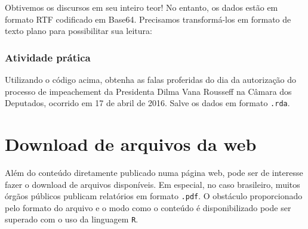 \documentclass[]{book}
\newenvironment{Shaded}{\begin{snugshade}}{\end{snugshade}}
\newcommand{\ControlFlowTok}[1]{\textcolor[rgb]{0.13,0.29,0.53}{\textbf{#1}}}
\newcommand{\DataTypeTok}[1]{\textcolor[rgb]{0.13,0.29,0.53}{#1}}
\newcommand{\DecValTok}[1]{\textcolor[rgb]{0.00,0.00,0.81}{#1}}
\newcommand{\KeywordTok}[1]{\textcolor[rgb]{0.13,0.29,0.53}{\textbf{#1}}}
\newcommand{\NormalTok}[1]{#1}
\newcommand{\OperatorTok}[1]{\textcolor[rgb]{0.81,0.36,0.00}{\textbf{#1}}}
\newcommand{\StringTok}[1]{\textcolor[rgb]{0.31,0.60,0.02}{#1}}
\begin{document}
Obtivemos os discursos em seu inteiro teor! No entanto, os dados estão em formato
RTF codificado em Base64. Precisamos transformá-los em formato de texto plano para
possibilitar sua leitura:

\begin{Shaded}
\end{Shaded}

\hypertarget{atividade-pruxe1tica-1}{%
\subsubsection{Atividade prática}\label{atividade-pruxe1tica-1}}

Utilizando o código acima, obtenha as falas proferidas do dia da autorização do
processo de impeachement da Presidenta Dilma Vana Rousseff na Câmara dos Deputados,
ocorrido em 17 de abril de 2016. Salve os dados em formato \texttt{.rda}.

\hypertarget{download-de-arquivos-da-web}{%
\section{Download de arquivos da web}\label{download-de-arquivos-da-web}}

Além do conteúdo diretamente publicado numa página web, pode ser de interesse
fazer o download de arquivos disponíveis. Em especial, no caso brasileiro, muitos
órgãos públicos publicam relatórios em formato \texttt{.pdf}. O obstáculo proporcionado
pelo formato do arquivo e o modo como o conteúdo é disponibilizado pode ser superado
com o uso da linguagem \texttt{R}.
\end{document}
